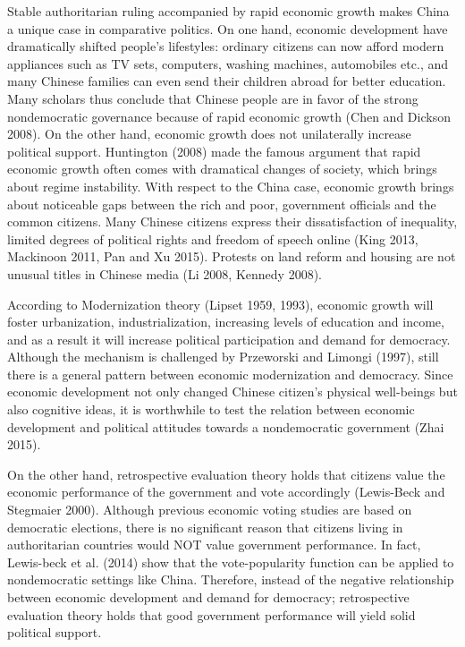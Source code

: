 \documentclass[12pt]{article}\usepackage[]{graphicx}\usepackage[]{color}
\begin{document}
Stable authoritarian ruling accompanied by rapid economic growth makes China a unique case in comparative politics. On one hand, economic development have dramatically shifted people's lifestyles: ordinary citizens can now afford modern appliances such as TV sets, computers, washing machines, automobiles etc., and many Chinese families can even send their children abroad for better education. Many scholars thus conclude that Chinese people are in favor of the strong nondemocratic governance because of rapid economic growth (Chen and Dickson 2008). On the other hand, economic growth does not unilaterally increase political support. Huntington (2008) made the famous argument that rapid economic growth often comes with dramatical changes of society, which brings about regime instability. With respect to the China case, economic growth brings about noticeable gaps between the rich and poor, government officials and the common citizens. Many Chinese citizens express their dissatisfaction of inequality, limited degrees of political rights and freedom of speech online (King 2013, Mackinoon 2011, Pan and Xu 2015). Protests on land reform and housing are not unusual titles in Chinese media (Li 2008, Kennedy 2008).

According to Modernization theory (Lipset 1959, 1993), economic growth will foster urbanization, industrialization, increasing levels of education and income, and as a result it will increase political participation and demand for democracy. Although the mechanism is challenged by Przeworski and Limongi (1997), still there is a general pattern between economic modernization and democracy. Since economic development not only changed Chinese citizen's physical well-beings but also cognitive ideas, it is worthwhile to test the relation between economic development and political attitudes towards a nondemocratic government (Zhai 2015).

On the other hand, retrospective evaluation theory holds that citizens value the economic performance of the government and vote accordingly (Lewis-Beck and Stegmaier 2000).  Although previous economic voting studies are based on democratic elections, there is no significant reason that citizens living in authoritarian countries would NOT value government performance. In fact, Lewis-beck et al. (2014) show that the vote-popularity function can be applied to nondemocratic settings like China. Therefore, instead of the negative relationship between economic development and demand for democracy; retrospective evaluation theory holds that good government performance will yield solid political support.
\end{document}
